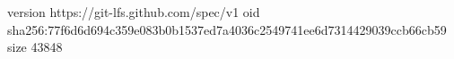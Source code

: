 version https://git-lfs.github.com/spec/v1
oid sha256:77f6d6d694c359e083b0b1537ed7a4036c2549741ee6d7314429039ccb66cb59
size 43848
